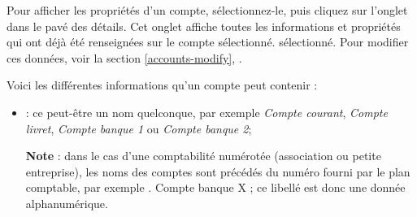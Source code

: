 Pour afficher les propriétés d'un compte, sélectionnez-le, puis cliquez sur l'onglet  dans le pavé des détails. Cet onglet affiche toutes les informations et propriétés qui ont déjà été renseignées sur le compte \ifIllustration sélectionné.
\else sélectionné.
\fi
Pour modifier ces données, voir la section \vref{accounts-modify}, .

Voici les différentes informations qu'un compte peut contenir :

\begin{itemize}
	\item {} : ce peut-être un nom quelconque, par exemple \emph{Compte courant}, \emph{Compte livret}, \emph{Compte banque 1} ou \emph{Compte banque 2};	

\textbf{Note} : dans le cas d'une comptabilité numérotée (association ou petite entreprise), les noms des comptes sont précédés du numéro fourni par le plan comptable, par exemple . Compte banque X \fg{} ; ce libellé est donc une donnée alphanumérique.


\end{itemize}
